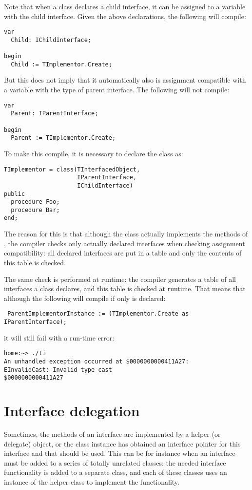 Note that when a class declares a child interface, it can be assigned to a variable with the child interface. 
Given the above declarations, the following will compile:
\begin{verbatim}
var
  Child: IChildInterface;

begin
  Child := TImplementor.Create;
\end{verbatim}
But this does not imply that it automatically also is assignment compatible with a variable with the type of parent interface. The following will not compile:
\begin{verbatim}
var
  Parent: IParentInterface;

begin
  Parent := TImplementor.Create;
\end{verbatim}
To make this compile, it is necessary to declare the class as:
\begin{verbatim}
TImplementor = class(TInterfacedObject, 
                     IParentInterface, 
                     IChildInterface)
public
  procedure Foo;
  procedure Bar;
end;
\end{verbatim}
The reason for this is that although the class actually implements the methods of , the compiler checks only actually declared interfaces when checking assignment compatibility: all declared interfaces are put in a table and only the contents of this table is checked.

The same check is performed at runtime: the compiler generates a table of all interfaces a class declares, and this table is checked at runtime. That means that although the following will compile if only  is declared:
\begin{verbatim}
 ParentImplementorInstance := (TImplementor.Create as IParentInterface);
\end{verbatim}
it will still fail with a run-time error:
\begin{verbatim}
home:~> ./ti
An unhandled exception occurred at $0000000000411A27:
EInvalidCast: Invalid type cast
$0000000000411A27
\end{verbatim}

\section{Interface delegation}
Sometimes, the methods of an interface are implemented by a helper (or
delegate) object, or the class instance has obtained an interface pointer for
this interface and that should be used. This can be for instance when an
interface must be added to a series of totally unrelated classes: the needed
interface functionality is added to a separate class, and each of these
classes uses an instance of the helper class to implement the functionality.

